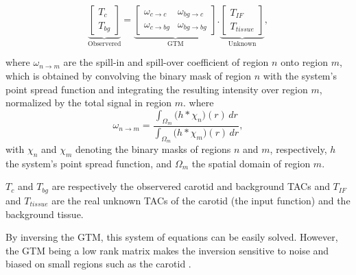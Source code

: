\begin{equation}
	\underbrace{
		\begin{bmatrix}
			T_{c} \\
			T_{bg}
		\end{bmatrix}
	}_{\text{Observered}}
	=
	\underbrace{
		\begin{bmatrix}
			\omega_{c \rightarrow c}  & \omega_{bg \rightarrow c}  \\
			\omega_{c \rightarrow bg} & \omega_{bg \rightarrow bg}
		\end{bmatrix}
	}_{\text{GTM}}
	.
	\underbrace{
		\begin{bmatrix}
			T_{IF} \\
			T_{tissue}
		\end{bmatrix}
	}_{\text{Unknown}},
\end{equation}

where $\omega_{n \rightarrow m}$ are the spill-in and spill-over coefficient of region $n$ onto region $m$, which is obtained by convolving the binary mask of region $n$ with the system's point spread function and integrating the resulting intensity over region $m$, normalized by the total signal in region $m$.
where
\begin{equation}
	\omega_{n\to m} = \frac{\displaystyle \int_{\Omega_m} \bigl( h \ast \chi_n \bigr)(r)\,dr}{\displaystyle \int_{\Omega_m} \bigl( h \ast \chi_m \bigr)(r)\,dr},
\end{equation}
with \(\chi_n\) and \(\chi_m\) denoting the binary masks of regions \(n\) and \(m\), respectively, \(h\) the system's point spread function, and \(\Omega_m\) the spatial domain of region \(m\).

$T_{c}$ and $T_{bg}$ are respectively the observered carotid and background TACs and $T_{IF}$ and $T_{tissue}$ are the real unknown TACs of the carotid (the input function) and the background tissue.

By inversing the GTM, this system of equations can be easily solved.
However, the GTM being a low rank matrix makes the inversion sensitive to noise and biased on small regions such as the carotid \cite{zanotti2011image, boellaard2004effects}.

